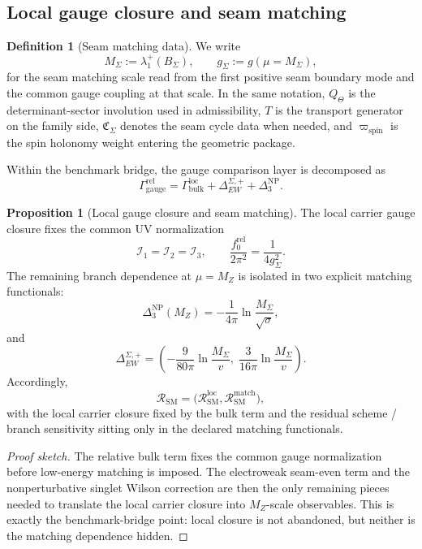 \documentclass[11pt,a4paper]{article}
\theoremstyle{definition}
\newtheorem{definition}[theorem]{Definition}
\newtheorem{proposition}[theorem]{Proposition}
\theoremstyle{remark}
\newcommand{\Seam}{\Sigma}
\newcommand{\SM}{\mathrm{SM}}
\newcommand{\wspin}{\varpi_{\mathrm{spin}}}
\begin{document}
\subsection{Local gauge closure and seam matching}

\begin{definition}[Seam matching data]
We write
\[
M_\Sigma:=\lambda_1^+(B_\Sigma),
\qquad
g_\Sigma:=g(\mu=M_\Sigma),
\]
for the seam matching scale read from the first positive seam boundary mode and the common gauge coupling at that scale. In the same notation, $Q_\Theta$ is the determinant-sector involution used in admissibility, $T$ is the transport generator on the family side, $\mathfrak C_\Sigma$ denotes the seam cycle data when needed, and $\wspin$ is the spin holonomy weight entering the geometric package.
\end{definition}

Within the benchmark bridge, the gauge comparison layer is decomposed as
\begin{equation}
\label{eq:relative-gauge-split}
\Gamma_{\mathrm{gauge}}^{\mathrm{rel}}
=
\Gamma_{\mathrm{bulk}}^{\mathrm{loc}}
+
\Delta_{EW}^{\Seam,+}
+
\Delta_3^{\mathrm{NP}}.
\end{equation}

\begin{proposition}[Local gauge closure and seam matching]
\label{prop:local-gauge-closure-matching}
The local carrier gauge closure fixes the common UV normalization
\[
\mathcal I_1=\mathcal I_2=\mathcal I_3,
\qquad
\frac{f_0^{\mathrm{rel}}}{2\pi^2}=\frac{1}{4g_\Seam^2}.
\]
The remaining branch dependence at $\mu=M_Z$ is isolated in two explicit matching functionals:
\[
\Delta_3^{\mathrm{NP}}(M_Z)
=
-\frac{1}{4\pi}\ln\frac{M_\Seam}{\sqrt{\sigma}},
\]
and
\[
\Delta_{EW}^{\Seam,+}
=
\left(
-\frac{9}{80\pi}\ln\frac{M_\Seam}{v},
\;
\frac{3}{16\pi}\ln\frac{M_\Seam}{v}
\right).
\]
Accordingly,
\[
\mathcal R_{\SM}
=
\bigl(\mathcal R_{\SM}^{\mathrm{loc}},\mathcal R_{\SM}^{\mathrm{match}}\bigr),
\]
with the local carrier closure fixed by the bulk term and the residual scheme / branch sensitivity sitting only in the declared matching functionals.
\end{proposition}

\begin{proof}[Proof sketch]
The relative bulk term fixes the common gauge normalization before low-energy matching is imposed. The electroweak seam-even term and the nonperturbative singlet Wilson correction are then the only remaining pieces needed to translate the local carrier closure into $M_Z$-scale observables. This is exactly the benchmark-bridge point: local closure is not abandoned, but neither is the matching dependence hidden.
\end{proof}
\end{document}
